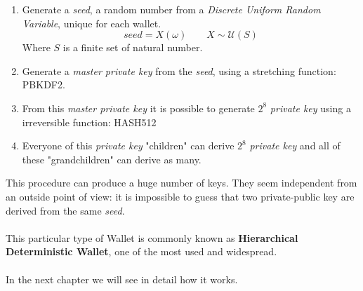 \begin{enumerate}[label=(\roman*)]
	\item Generate a \textit{seed}, a random number from a \textit{Discrete Uniform Random Variable}, unique for each wallet.
	\begin{equation*}
	seed=X(\omega) \qquad X\sim \mathcal{U}(S)
	\end{equation*}
	Where $S$ is a finite set of natural number.
	\item Generate a \textit{master private key} from the \textit{seed}, using a stretching function: PBKDF2.
	\item From this \textit{master private key} it is possible to generate $2^{8}$ \textit{private key} using a irreversible function: HASH512
	\item Everyone of this \textit{private key} "children" can derive $2^{8}$ \textit{private key} and all of these "grandchildren" can derive as many.
\end{enumerate}

This procedure can produce a huge number of keys. They seem independent from an outside point of view: it is impossible to guess that two private-public key are derived from the same \textit{seed}.
\\ \\ 
This particular type of Wallet is commonly known as \textbf{Hierarchical Deterministic Wallet}, one of the most used and widespread.
\\ \\
In the next chapter we will see in detail how it works.
